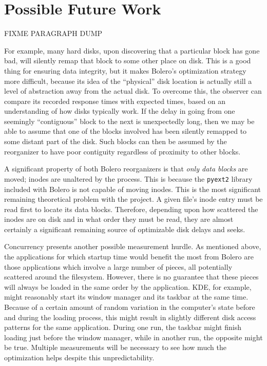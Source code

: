 \documentclass[10pt,twocolumn,letterpaper]{article}
\begin{document}
\section{Possible Future Work}\label{sec:future}

FIXME PARAGRAPH DUMP

For example, many hard disks, upon discovering that a particular block has gone bad, will silently
remap that block to some other place on disk\cite{remapping}. This is a good thing for ensuring
data integrity, but it makes Bolero's optimization strategy more difficult, because
its idea of the ``physical'' disk location is actually still a level of abstraction away from
the actual disk. To overcome this, the observer can compare its recorded response
times with expected times, based on an understanding of how disks typically work.
If the delay in going from one seemingly ``contiguous'' block to the next
is unexpectedly long, then we may be able to assume that one of the blocks involved
has been silently remapped to some distant part of the disk. Such blocks can then be
assumed by the reorganizer to have poor contiguity regardless of proximity to other
blocks.

A significant property of both Bolero reorganizers is that \emph{only data blocks} are moved; inodes are
unaltered by the process. This is because the \texttt{pyext2} library included with Bolero is not capable of moving inodes. This is the most significant remaining theoretical problem with the project. A given file's inode entry must be read first to locate its data blocks. Therefore, depending upon how scattered the inodes are on disk and in what order they must be read, they are almost certainly a significant remaining source of optimizable disk delays and seeks.

Concurrency presents another possible measurement hurdle. As mentioned above, the applications for
which startup time would benefit the most from Bolero are those applications which involve a
large number of pieces, all potentially scattered around the filesystem. However, there is no guarantee
that these pieces will always be loaded in the same order by the application. KDE, for example, might reasonably start its window manager and its taskbar at the same time. Because of a certain amount of random
variation in the computer's state before and during the loading process, this might result in
slightly different disk access patterns for the same application. During one run, the taskbar might finish loading just before the window manager, while in another run, the opposite might be true. Multiple
measurements will be necessary to see how much the optimization helps despite this unpredictability.
\end{document}
